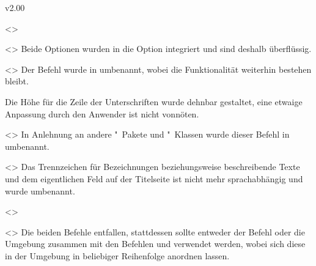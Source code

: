 \begin{Entity}{}
\begin{NoIndexDefault}
\begin{Cessations}{v2.00}
\begin{Cessation}
  {}
  <>
\begin{Cessation}
  {}
  <>
\printdeclarationlist
%
Beide Optionen wurden in die Option  integriert und sind 
deshalb überflüssig.
\end{Cessation}
\end{Cessation}

\begin{Cessation}
  {}
  <>
\printdeclarationlist
%
Der Befehl wurde in  umbenannt, wobei die Funktionalität 
weiterhin bestehen bleibt.
\end{Cessation}

\begin{Cessation}
  {}
\printdeclarationlist
%
Die Höhe für die Zeile der Unterschriften wurde dehnbar gestaltet, eine etwaige 
Anpassung durch den Anwender ist nicht vonnöten.
\end{Cessation}

\begin{Cessation}
  {}
  <>
\printdeclarationlist
%
In Anlehnung an andere "~Pakete und "~Klassen wurde 
dieser Befehl in  umbenannt.
\end{Cessation}

\begin{Cessation}
  {}
  <>
\printdeclarationlist
%
Das Trennzeichen für Bezeichnungen beziehungsweise beschreibende Texte und dem 
eigentlichen Feld auf der Titelseite ist nicht mehr sprachabhängig und wurde 
umbenannt.
\end{Cessation}

\begin{Cessation}
  {}
  <>
\begin{Cessation}
  {}
  <>
\printdeclarationlist
%
Die beiden Befehle entfallen, stattdessen sollte entweder der Befehl 
 oder die Umgebung  zusammen mit 
den Befehlen  und  verwendet werden, wobei 
sich diese in der Umgebung in beliebiger Reihenfolge anordnen lassen.
\end{Cessation}
\end{Cessation}



\end{Cessations}
\end{NoIndexDefault}
\end{Entity}
